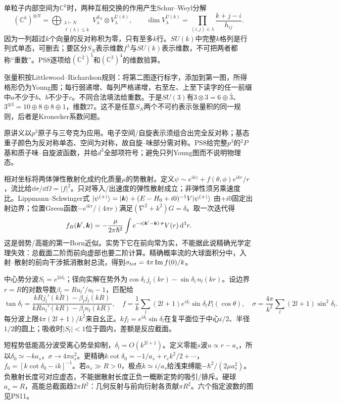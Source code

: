 单粒子内部空间为$\mathbb C^k$时，两种互相交换的作用产生Schur--Weyl分解
\[
 (\mathbb C^k)^{\otimes N}
 =\bigoplus_{\substack{\lambda\vdash N\\\ell(\lambda)\le k}}
 V^{S_N}_\lambda\otimes V^{U(k)}_\lambda,\qquad
 \dim V^{U(k)}_\lambda=\prod_{(i,j)\in\lambda}\frac{k+j-i}{h_{ij}}.
\]
因为一列超过$k$个向量的反对称积为零，只有至多$k$行。$SU(k)$中完整$k$格列是行列式单态，可删去；要区分$S_N$表示维数$f^\lambda$与$SU(k)$表示维数，不可把两者都称“重数”。PS8逐项给$(\mathbb C^2)^5$和$(\mathbb C^3)^4$的维数验算。

张量积按Littlewood--Richardson规则：将第二图逐行标字，添加到第一图，所得格形仍为Young图；每行弱递增、每列严格递增，右至左、上至下读字的任一前缀中$a$不少于$b$、$b$不少于$c$。不同合法填法给重数。于是$SU(3)$有$3\otimes3=6\oplus\bar3$、$3^{\otimes3}=10\oplus8\oplus8\oplus1$，维数$27$。这不是任意$S_N$两个不可约表示张量积的同一规则，后者是Kronecker系数问题。

原讲义以$p^3$原子与三夸克为应用。电子空间/自旋表示须组合出完全反对称；基态重子颜色为反对称单态、空间为对称，故自旋--味部分需对称。PS8给完整$p^3$的$^2P$基和质子味--自旋波函数，并给$d^3$全部项符号；避免只列Young图而不说明物理态。

相对坐标将两体弹性散射化成约化质量$\mu$的势散射。定义$\psi\sim e^{ikz}+f(\theta,\phi)e^{ikr}/r$，流比给$\dd\sigma/\dd\Omega=|f|^2$。只对等入/出速度的弹性散射成立；非弹性须另乘速度比。Lippmann--Schwinger式
$|\psi^{(+)}\rangle=|\boldsymbol{k}\rangle+(E-H_0+i0)^{-1}V|\psi^{(+)}\rangle$
由$+i0$固定出射边界；位置Green函数$-e^{ikr}/(4\pi r)$满足$(\nabla^2+k^2)G=\delta$。取一次迭代得
\[
 f_B(\boldsymbol{k}',\boldsymbol{k})=-\frac{\mu}{2\pi\hbar^2}
 \int e^{-i(\boldsymbol{k}'-\boldsymbol{k})\cdot\boldsymbol{r}}V(r)\,\mathrm d^3r.
\]
这是弱势/高能的第一Born近似。实势下它在前向常为实，不能据此说精确光学定理失效：总截面二阶而前向虚部也要二阶计算。精确概率流的大球面积分中，入射--散射的前向干涉抵消散射总流，得到$\sigma_{\rm tot}=4\pi\operatorname{Im}f(0)/k$。

中心势分波$S_l=e^{2i\delta_l}$；径向实解在势外为$\cos\delta_l\,j_l(kr)-\sin\delta_l\,n_l(kr)$。设边界$r=R$的对数导数$\beta_l=Ru_l'/u_l-1$，匹配给
\[
 \tan\delta_l=\frac{kRj_l'(kR)-\beta_lj_l(kR)}
 {kRn_l'(kR)-\beta_ln_l(kR)},\quad
 f=\frac1k\sum_l(2l+1)e^{i\delta_l}\sin\delta_lP_l(\cos\theta),\quad
 \sigma=\frac{4\pi}{k^2}\sum_l(2l+1)\sin^2\delta_l.
\]
每分波上限$4\pi(2l+1)/k^2$来自幺正。$kf_l=e^{i\delta_l}\sin\delta_l$在复平面位于中心$i/2$、半径$1/2$的圆上；吸收时$|S_l|<1$位于圆内，差额是反应截面。

短程势低能高分波受离心势垒抑制，$\delta_l=O(k^{2l+1})$。定义零能$s$波$u\propto r-a_s$，所以$\delta_0\simeq-ka_s$，$\sigma\to4\pi a_s^2$。更精确$k\cot\delta_0=-1/a_s+r_ek^2/2+\cdots$，$f_0=[k\cot\delta_0-ik]^{-1}$。若$a_s\gg R>0$，极点$k\simeq i/a_s$给浅束缚能$-\hbar^2/(2\mu a_s^2)$。负散射长度可对应虚态，不能据散射长度正负一概断定势的吸引/排斥。硬球$a_s=R$，高能总截面趋$2\pi R^2$：几何反射与前向衍射各贡献$\pi R^2$。六个指定波数的图见PS11。

